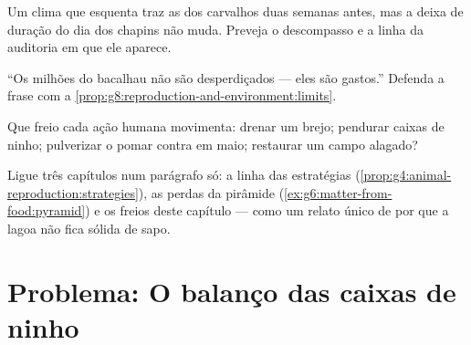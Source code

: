 \begin{exercise}[$\star\star$]\label{exo:g8:reproduction-and-environment:9}
Um clima que esquenta traz as  dos carvalhos duas semanas
antes, mas a deixa de duração do dia dos chapins não muda. Preveja o
descompasso e a linha da auditoria em que ele aparece.
\end{exercise}

\begin{exercise}[$\star\star$]\label{exo:g8:reproduction-and-environment:10}
``Os milhões do bacalhau não são desperdiçados --- eles são gastos.''
Defenda a frase com a
\cref{prop:g8:reproduction-and-environment:limits}.
\end{exercise}

\begin{exercise}[$\star\star$]\label{exo:g8:reproduction-and-environment:11}
Que freio cada ação humana movimenta: drenar um brejo; pendurar caixas
de ninho; pulverizar o pomar contra  em maio; restaurar um
campo alagado?
\end{exercise}

\begin{exercise}[$\star\star\star$]\label{exo:g8:reproduction-and-environment:12}
Ligue três capítulos num parágrafo só: a linha das estratégias
(\cref{prop:g4:animal-reproduction:strategies}), as perdas da pirâmide
(\cref{ex:g6:matter-from-food:pyramid}) e os freios deste capítulo ---
como um relato único de por que a lagoa não fica sólida de sapo.
\end{exercise}

\section{Problema: O balanço das caixas de ninho}

